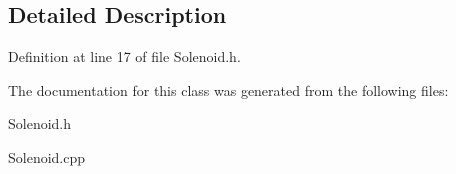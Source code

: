 \subsection{\-Detailed \-Description}


\-Definition at line 17 of file \-Solenoid.\-h.



\-The documentation for this class was generated from the following files\-:\begin{DoxyCompactItemize}
\item 
\-Solenoid.\-h\item 
\-Solenoid.\-cpp\end{DoxyCompactItemize}
